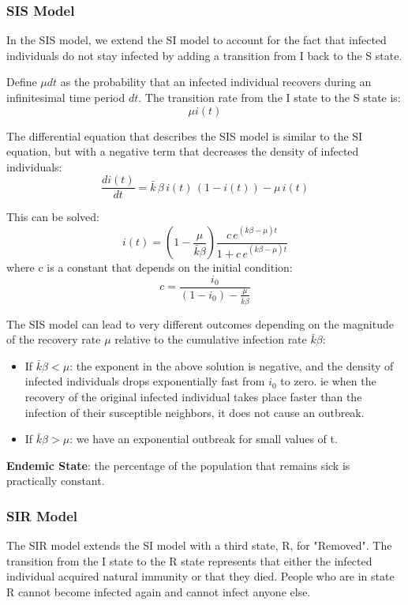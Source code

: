 \documentclass[11pt]{scrartcl} %
\begin{document}

\subsubsection{SIS Model}
In the SIS model, we extend the SI model to account for the fact that infected individuals do not stay infected by adding a transition from I back to the S state. 

Define $\mu dt$ as the probability that an infected individual recovers during an infinitesimal time period $dt$. The transition rate from the I state to the S state is:
\[ \mu i(t) \]

The differential equation that describes the SIS model is similar to the SI equation, but with a negative term that decreases the density of infected individuals:
\[ \frac{di(t)}{dt} = \bar{k} \, \beta \, i(t) \, (1-i(t)) - \mu \, i(t) \]

This can be solved: 
\[ i(t) = (1-\frac{\mu}{\bar{k} \beta}) \frac{c \, e^{(\bar{k}\beta-\mu)t}}{1 + c \, e^{(\bar{k} \beta-\mu)t} } \]
where c is a constant that depends on the initial condition:
\[ c= \frac{i_0}{(1-i_0)-\frac{\mu}{\bar{k} \beta}} \] 

The SIS model can lead to very different outcomes depending on the magnitude of the recovery rate $\mu$ relative to the cumulative infection rate $\bar{k} \beta$:
\begin{itemize}
	\item If $\bar{k} \beta < \mu$: the exponent in the above solution is negative, and the density of infected individuals drops exponentially fast from $i_0$ to zero. ie when the recovery of the original infected individual takes place faster than the infection of their susceptible neighbors, it does not cause an outbreak.
	\item If $\bar{k} \beta > \mu$: we have an exponential outbreak for small values of t. 
\end{itemize}

\textbf{Endemic State}: the percentage of the population that remains sick is practically constant.


\subsubsection{SIR Model}
The SIR model extends the SI model with a third state, R, for "Removed". The transition from the I state to the R state represents that either the infected individual acquired natural immunity or that they died. People who are in state R cannot become infected again and cannot infect anyone else.
\end{document}
